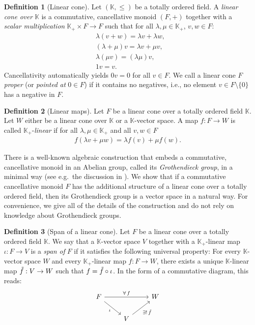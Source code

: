\documentclass[a4paper,11pt]{article}
\numberwithin{equation}{section}
\theoremstyle{definition}
\newtheorem{Definition}{Definition}[section]
\theoremstyle{plain}
\begin{document}
\begin{Definition}[Linear cone]
Let $(\mathbb{K},\leq)$ be a totally ordered field. A \emph{linear cone over} $\mathbb{K}$ is a commutative, cancellative monoid $(F,+)$ together with a \emph{scalar multiplication} $\mathbb{K}_+ \times F \to F$ such that for all $\lambda, \mu \in \mathbb{K}_+$, $v,w \in F$:
\begin{align}
    &\lambda(v + w) = \lambda v + \lambda w,\\
    &(\lambda + \mu)v = \lambda v + \mu v,\\
    &\lambda (\mu v) = (\lambda \mu)v,\\
    &1v = v.
\end{align}
Cancellativity automatically yields $0v = 0$ for all $v \in F$. We call a linear cone $F$ \emph{proper} (or \emph{pointed at} $0 \in F$) if it contains no negatives, i.e., no element $v \in F\setminus \{0\}$ has a negative in $F$.
\end{Definition}

\begin{Definition}[Linear maps]
Let $F$ be a linear cone over a totally ordered field $\mathbb{K}$. Let $W$ either be a linear cone over $\mathbb{K}$ or a $\mathbb{K}$-vector space. A map $f: F \to W$ is called $\mathbb{K}_+$-\emph{linear} if for all $\lambda, \mu \in \mathbb{K}_+$ and all $v,w \in F$
\begin{align}
    f(\lambda v + \mu w) = \lambda f(v) + \mu f(w).
\end{align}
\end{Definition}
There is a well-known algebraic construction that embeds a commutative, cancellative monoid in an Abelian group, called its \textit{Grothendieck group}, in a minimal way (see e.g.\ the discussion in \cite[p.50]{BrunsGubeladze}). We show that if a commutative cancellative monoid $F$ has the additional structure of a linear cone over a totally ordered field, then its Grothendieck group is a vector space in a natural way. For convenience, we give all of the details of the construction and do not rely on knowledge about Grothendieck groups.
\begin{Definition}[Span of a linear cone]
Let $F$ be a linear cone over a totally ordered field $\mathbb{K}$. We say that a $\mathbb{K}$-vector space $V$ together with a $\mathbb{K}_+$-linear map $\iota:F \to V$ is a \emph{span of} $F$ if it satisfies the following universal property: For every $\mathbb{K}$-vector space $W$ and every $\mathbb{K}_+$-linear map $f:F \to W$, there exists a unique $\mathbb{K}$-linear map $\Tilde{f}:V \to W$ such that $f = \Tilde{f} \circ \iota$. In the form of a commutative diagram, this reads:
\[
\begin{tikzcd}
F \arrow[dr, "\iota"'] \arrow[rr, "\forall \, f"] & & W \\
& V \arrow[ur, "\exists! \, \tilde{f}"'] &
\end{tikzcd}
\]
\end{Definition}
\end{document}
